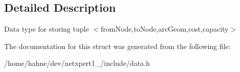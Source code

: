 \subsection{Detailed Description}
Data type for storing tuple $<$from\+Node,to\+Node,arc\+Geom,cost,capacity$>$ 

The documentation for this struct was generated from the following file\+:\begin{DoxyCompactItemize}
\item 
/home/hahne/dev/netxpert1\+\_/include/data.\+h\end{DoxyCompactItemize}

